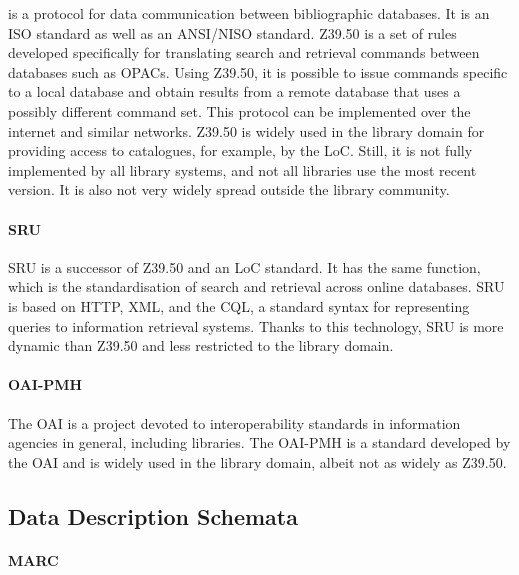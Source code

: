 is a protocol for data communication between bibliographic databases.
%
%
%
It is an \gls{ISO} standard as well as an \gls{ANSI}/\gls{NISO} standard.
%
Z39.50 is a set of rules developed specifically
for translating search and retrieval commands between databases such as OPACs.
Using Z39.50, it is possible to issue commands specific to a local database
and obtain results from a remote database that uses a possibly different command set.
This protocol can be implemented over the internet and similar networks.
Z39.50 is widely used in the library domain for providing access to catalogues,
for example, by the \gls{LoC}. Still, it is not fully implemented by all library systems,
and not all libraries use the most recent version. It is also not very widely spread
outside the library community.

\paragraph{SRU}

\gls{SRU} is a successor of \gls{Z39.50} and an \gls{LoC} standard.
It has the same function, which is the standardisation of search and retrieval
across online databases. 
SRU is based on \gls{HTTP}, \gls{XML}, and the \gls{CQL}, 
a standard syntax for representing queries to information retrieval systems.
Thanks to this technology, SRU is more dynamic than \gls{Z39.50}
and less restricted to the library domain.

\paragraph{OAI-PMH}

The \gls{OAI} is a project devoted to interoperability standards in information agencies
in general, including libraries.
The \gls{OAI-PMH} is a standard developed by the OAI
and is widely used in the library domain, albeit not as widely as \gls{Z39.50}.

\subsection{Data Description Schemata}
\label{subsec:data_descr_schemata}

\paragraph{MARC}

